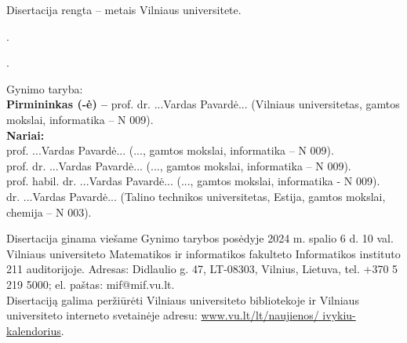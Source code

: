 \begin{singlespace}
\noindent\nohyphens{Disertacija rengta {\thesisPreparationStartYear} -- {\thesisYear} metais Vilniaus universitete.}

\vspace{1cm}

.

.

\vspace{2cm}
\noindent
Gynimo taryba:  \\
{\bf Pirmininkas (-ė) --} {{prof. dr. ...Vardas Pavardė...} (Vilniaus universitetas, gamtos mokslai, informatika -- N 009).\\}
{\bf Nariai:}\\ %
{prof. ...Vardas Pavardė...}
(..., gamtos mokslai, informatika -- N 009).\\
{prof. dr. ...Vardas Pavardė...}
(..., gamtos mokslai, informatika – N 009).\\
{prof. habil. dr. ...Vardas Pavardė...}
(..., gamtos mokslai, informatika - N 009).\\
{dr. ...Vardas Pavardė...}
(Talino technikos universitetas, Estija, gamtos mokslai, chemija -- N 003).


\vspace{2cm}
\noindent
Disertacija ginama viešame Gynimo tarybos posėdyje 2024 m. spalio 6 d. 10 val. Vilniaus universiteto Matematikos ir informatikos fakulteto Informatikos instituto 211 auditorijoje. Adresas: Didlaulio g. 47, LT-08303, Vilnius, Lietuva, tel. +370 5 219 5000; el. paštas: mif@mif.vu.lt.\\

\vspace{1cm}
\noindent
Disertaciją galima peržiūrėti Vilniaus universiteto bibliotekoje ir Vilniaus universiteto interneto svetainėje adresu: \href{ www.vu.lt/lt/naujienos/ivykiu-kalendorius}{ www.vu.lt/lt/naujienos/ ivykiu-kalendorius}. 



\end{singlespace}

